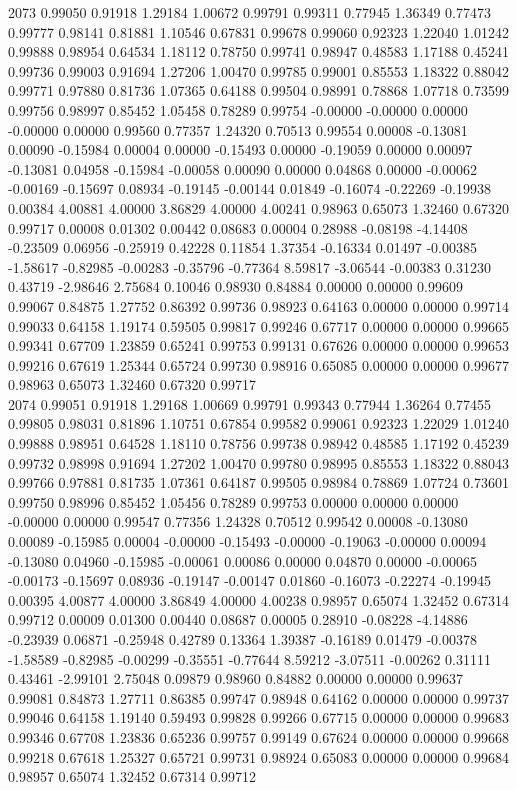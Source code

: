 {2073 0.99050 0.91918 1.29184 1.00672 0.99791 0.99311 0.77945 1.36349 0.77473 0.99777 0.98141 0.81881 1.10546 0.67831 0.99678 0.99060 0.92323 1.22040 1.01242 0.99888 0.98954 0.64534 1.18112 0.78750 0.99741 0.98947 0.48583 1.17188 0.45241 0.99736 0.99003 0.91694 1.27206 1.00470 0.99785 0.99001 0.85553 1.18322 0.88042 0.99771 0.97880 0.81736 1.07365 0.64188 0.99504 0.98991 0.78868 1.07718 0.73599 0.99756 0.98997 0.85452 1.05458 0.78289 0.99754 -0.00000 -0.00000 0.00000 -0.00000 0.00000 0.99560 0.77357 1.24320 0.70513 0.99554 0.00008 -0.13081 0.00090 -0.15984 0.00004 0.00000 -0.15493 0.00000 -0.19059 0.00000 0.00097 -0.13081 0.04958 -0.15984 -0.00058 0.00090 0.00000 0.04868 0.00000 -0.00062 -0.00169 -0.15697 0.08934 -0.19145 -0.00144 0.01849 -0.16074 -0.22269 -0.19938 0.00384 4.00881 4.00000 3.86829 4.00000 4.00241 0.98963 0.65073 1.32460 0.67320 0.99717 0.00008 0.01302 0.00442 0.08683 0.00004 0.28988 -0.08198 -4.14408 -0.23509 0.06956 -0.25919 0.42228 0.11854 1.37354 -0.16334 0.01497 -0.00385 -1.58617 -0.82985 -0.00283 -0.35796 -0.77364 8.59817 -3.06544 -0.00383 0.31230 0.43719 -2.98646 2.75684 0.10046 0.98930 0.84884 0.00000 0.00000 0.99609 0.99067 0.84875 1.27752 0.86392 0.99736 0.98923 0.64163 0.00000 0.00000 0.99714 0.99033 0.64158 1.19174 0.59505 0.99817 0.99246 0.67717 0.00000 0.00000 0.99665 0.99341 0.67709 1.23859 0.65241 0.99753 0.99131 0.67626 0.00000 0.00000 0.99653 0.99216 0.67619 1.25344 0.65724 0.99730 0.98916 0.65085 0.00000 0.00000 0.99677 0.98963 0.65073 1.32460 0.67320 0.99717 \\
2074 0.99051 0.91918 1.29168 1.00669 0.99791 0.99343 0.77944 1.36264 0.77455 0.99805 0.98031 0.81896 1.10751 0.67854 0.99582 0.99061 0.92323 1.22029 1.01240 0.99888 0.98951 0.64528 1.18110 0.78756 0.99738 0.98942 0.48585 1.17192 0.45239 0.99732 0.98998 0.91694 1.27202 1.00470 0.99780 0.98995 0.85553 1.18322 0.88043 0.99766 0.97881 0.81735 1.07361 0.64187 0.99505 0.98984 0.78869 1.07724 0.73601 0.99750 0.98996 0.85452 1.05456 0.78289 0.99753 0.00000 0.00000 0.00000 -0.00000 0.00000 0.99547 0.77356 1.24328 0.70512 0.99542 0.00008 -0.13080 0.00089 -0.15985 0.00004 -0.00000 -0.15493 -0.00000 -0.19063 -0.00000 0.00094 -0.13080 0.04960 -0.15985 -0.00061 0.00086 0.00000 0.04870 0.00000 -0.00065 -0.00173 -0.15697 0.08936 -0.19147 -0.00147 0.01860 -0.16073 -0.22274 -0.19945 0.00395 4.00877 4.00000 3.86849 4.00000 4.00238 0.98957 0.65074 1.32452 0.67314 0.99712 0.00009 0.01300 0.00440 0.08687 0.00005 0.28910 -0.08228 -4.14886 -0.23939 0.06871 -0.25948 0.42789 0.13364 1.39387 -0.16189 0.01479 -0.00378 -1.58589 -0.82985 -0.00299 -0.35551 -0.77644 8.59212 -3.07511 -0.00262 0.31111 0.43461 -2.99101 2.75048 0.09879 0.98960 0.84882 0.00000 0.00000 0.99637 0.99081 0.84873 1.27711 0.86385 0.99747 0.98948 0.64162 0.00000 0.00000 0.99737 0.99046 0.64158 1.19140 0.59493 0.99828 0.99266 0.67715 0.00000 0.00000 0.99683 0.99346 0.67708 1.23836 0.65236 0.99757 0.99149 0.67624 0.00000 0.00000 0.99668 0.99218 0.67618 1.25327 0.65721 0.99731 0.98924 0.65083 0.00000 0.00000 0.99684 0.98957 0.65074 1.32452 0.67314 0.99712 \\
}
